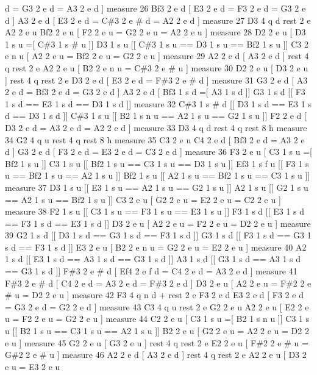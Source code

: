d = G3 2 e d = A3 2 e d \mbox{]} measure 26 Bf3 2 e d \mbox{[} E3 2 e d = F3 2 e d = G3 2 e d \mbox{]} A3 2 e d \mbox{[} E3 2 e d = C\#3 2 e \# d = A2 2 e d \mbox{]} measure 27 D3 4 q d rest 2 e A2 2 e u Bf2 2 e u \mbox{[} F2 2 e u = G2 2 e u = A2 2 e u \mbox{]} measure 28 D2 2 e u \mbox{[} D3 1 s u =\mbox{[} C\#3 1 s \# u \mbox{]}\mbox{]} D3 1 s u \mbox{[}\mbox{[} C\#3 1 s u == D3 1 s u == Bf2 1 s u \mbox{]}\mbox{]} C3 2 e n u \mbox{[} A2 2 e u = Bf2 2 e u = G2 2 e u \mbox{]} measure 29 A2 2 e d \mbox{[} A3 2 e d \mbox{]} rest 4 q rest 2 e A2 2 e u \mbox{[} B2 2 e n u = C\#3 2 e \# u \mbox{]} measure 30 D2 2 e u \mbox{[} D3 2 e u \mbox{]} rest 4 q rest 2 e D3 2 e d \mbox{[} E3 2 e d = F\#3 2 e \# d \mbox{]} measure 31 G3 2 e d \mbox{[} A3 2 e d = Bf3 2 e d = G3 2 e d \mbox{]} A3 2 e d \mbox{[} Bf3 1 s d =\mbox{[} A3 1 s d \mbox{]}\mbox{]} G3 1 s d \mbox{[}\mbox{[} F3 1 s d == E3 1 s d == D3 1 s d \mbox{]}\mbox{]} measure 32 C\#3 1 s \# d \mbox{[}\mbox{[} D3 1 s d == E3 1 s d == D3 1 s d \mbox{]}\mbox{]} C\#3 1 s u \mbox{[}\mbox{[} B2 1 s n u == A2 1 s u == G2 1 s u \mbox{]}\mbox{]} F2 2 e d \mbox{[} D3 2 e d = A3 2 e d = A2 2 e d \mbox{]} measure 33 D3 4 q d rest 4 q rest 8 h measure 34 G2 4 q u rest 4 q rest 8 h measure 35 C3 2 e u C4 2 e d \mbox{[} Bf3 2 e d = A3 2 e d \mbox{]} G3 2 e d \mbox{[} F3 2 e d = E3 2 e d = C3 2 e d \mbox{]} measure 36 F3 2 e u \mbox{[} C3 1 s u =\mbox{[} Bf2 1 s u \mbox{]}\mbox{]} C3 1 s u \mbox{[}\mbox{[} Bf2 1 s u == C3 1 s u == D3 1 s u \mbox{]}\mbox{]} Ef3 1 s f u \mbox{[}\mbox{[} F3 1 s u == Bf2 1 s u == A2 1 s u \mbox{]}\mbox{]} Bf2 1 s u \mbox{[}\mbox{[} A2 1 s u == Bf2 1 s u == C3 1 s u \mbox{]}\mbox{]} measure 37 D3 1 s u \mbox{[}\mbox{[} E3 1 s u == A2 1 s u == G2 1 s u \mbox{]}\mbox{]} A2 1 s u \mbox{[}\mbox{[} G2 1 s u == A2 1 s u == Bf2 1 s u \mbox{]}\mbox{]} C3 2 e u \mbox{[} G2 2 e u = E2 2 e u = C2 2 e u \mbox{]} measure 38 F2 1 s u \mbox{[}\mbox{[} C3 1 s u == F3 1 s u == E3 1 s u \mbox{]}\mbox{]} F3 1 s d \mbox{[}\mbox{[} E3 1 s d == F3 1 s d == E3 1 s d \mbox{]}\mbox{]} D3 2 e u \mbox{[} A2 2 e u = F2 2 e u = D2 2 e u \mbox{]} measure 39 G2 1 s d \mbox{[}\mbox{[} D3 1 s d == G3 1 s d == F3 1 s d \mbox{]}\mbox{]} G3 1 s d \mbox{[}\mbox{[} F3 1 s d == G3 1 s d == F3 1 s d \mbox{]}\mbox{]} E3 2 e u \mbox{[} B2 2 e n u = G2 2 e u = E2 2 e u \mbox{]} measure 40 A2 1 s d \mbox{[}\mbox{[} E3 1 s d == A3 1 s d == G3 1 s d \mbox{]}\mbox{]} A3 1 s d \mbox{[}\mbox{[} G3 1 s d == A3 1 s d == G3 1 s d \mbox{]}\mbox{]} F\#3 2 e \# d \mbox{[} Ef4 2 e f d = C4 2 e d = A3 2 e d \mbox{]} measure 41 F\#3 2 e \# d \mbox{[} C4 2 e d = A3 2 e d = F\#3 2 e d \mbox{]} D3 2 e u \mbox{[} A2 2 e u = F\#2 2 e \# u = D2 2 e u \mbox{]} measure 42 F3 4 q n d + rest 2 e F3 2 e d E3 2 e d \mbox{[} F3 2 e d = G3 2 e d = G2 2 e d \mbox{]} measure 43 C3 4 q u rest 2 e G2 2 e u A2 2 e u \mbox{[} E2 2 e u = F2 2 e u = G2 2 e u \mbox{]} measure 44 C2 2 e u \mbox{[} C3 1 s u =\mbox{[} B2 1 s n u \mbox{]}\mbox{]} C3 1 s u \mbox{[}\mbox{[} B2 1 s u == C3 1 s u == A2 1 s u \mbox{]}\mbox{]} B2 2 e u \mbox{[} G2 2 e u = A2 2 e u = D2 2 e u \mbox{]} measure 45 G2 2 e u \mbox{[} G3 2 e u \mbox{]} rest 4 q rest 2 e E2 2 e u \mbox{[} F\#2 2 e \# u = G\#2 2 e \# u \mbox{]} measure 46 A2 2 e d \mbox{[} A3 2 e d \mbox{]} rest 4 q rest 2 e A2 2 e u \mbox{[} D3 2 e u = E3 2 e u 
